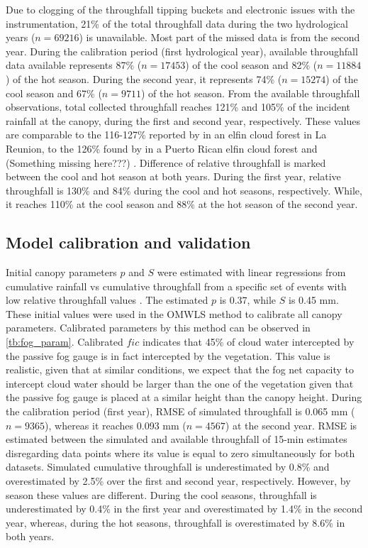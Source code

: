 \documentclass[a4paper,12pt]{article}
\begin{document}
\begin{linenumbers}
Due to clogging of the throughfall tipping buckets and electronic issues with the instrumentation, 21\% of the total throughfall data during the two hydrological years ($n=69216$) is unavailable. Most part of the missed data is from the second year. During the calibration period (first hydrological year), available throughfall data available represents 87\% ($n=17453$) of the cool season and 82\% ($n=11884$) of the hot season. During the second year, it represents 74\% ($n=15274$) of the cool season and 67\% ($n=9711$) of the hot season. From the available throughfall observations, total collected throughfall reaches 121\% and 105\% of the incident rainfall at the canopy, during the first and second year, respectively. These values are comparable to the 116-127\% reported by \cite{Gabrieletal2008} in an elfin cloud forest in La Reunion, to the 126\% found by  \citep{Holwerdaetal2006} in a Puerto Rican elfin cloud forest and (Something missing here???) . Difference of relative throughfall is marked between the cool and hot season at both years. During the first year, relative throughfall is 130\% and 84\% during the cool and hot seasons, respectively. While, it reaches 110\% at the cool season and 88\% at the hot season of the second year. 

\subsection{Model calibration and validation}
Initial canopy parameters $p$ and $S$ were estimated with linear regressions from cumulative rainfall vs cumulative throughfall from a specific set of events with low relative throughfall values \citep{Pryetetal2012a}. The estimated $p$ is 0.37, while $S$ is 0.45 mm. These initial values were used in the OMWLS method to calibrate all canopy parameters. Calibrated parameters by this method can be observed in \autoref{tb:fog_param}. Calibrated $fic$ indicates that 45\% of cloud water intercepted by the passive fog gauge is in fact intercepted by the vegetation. This value is realistic, given that at similar conditions, we expect that the fog net capacity to intercept cloud water should be larger than the one of the vegetation given that the passive fog gauge is placed at a similar height than the canopy height. During the calibration period (first year), RMSE of simulated throughfall is 0.065 mm ($n=9365$), whereas it reaches 0.093 mm ($n=4567$) at the second year. RMSE is estimated between the simulated and available throughfall of 15-min estimates disregarding data points where its value is equal to zero simultaneously for both datasets. Simulated cumulative throughfall is underestimated by 0.8\% and overestimated by 2.5\% over the first and second year, respectively. However, by season these values are different. During the cool seasons, throughfall is underestimated by 0.4\% in the first year and overestimated by 1.4\% in the second year, whereas, during the hot seasons, throughfall is overestimated by 8.6\% in both years.


\end{linenumbers}
\end{document}
